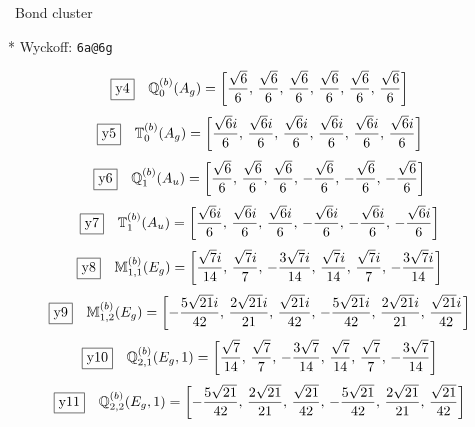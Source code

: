 \documentclass[fleqn,10pt,landscape]{jsarticle}
\begin{document}
\noindent\textbullet\, Bond cluster

\vspace{5mm}

\noindent ** Wyckoff: \texttt{6a@6g}

\begin{dmath*}
\fbox{y4}\quad \mathbb{Q}_{0}^{(b)}(A_{g})=\left[ \frac{\sqrt{6}}{6},\, \frac{\sqrt{6}}{6},\, \frac{\sqrt{6}}{6},\, \frac{\sqrt{6}}{6},\, \frac{\sqrt{6}}{6},\, \frac{\sqrt{6}}{6} \right]
\end{dmath*}
\begin{dmath*}
\fbox{y5}\quad \mathbb{T}_{0}^{(b)}(A_{g})=\left[ \frac{\sqrt{6} i}{6},\, \frac{\sqrt{6} i}{6},\, \frac{\sqrt{6} i}{6},\, \frac{\sqrt{6} i}{6},\, \frac{\sqrt{6} i}{6},\, \frac{\sqrt{6} i}{6} \right]
\end{dmath*}
\begin{dmath*}
\fbox{y6}\quad \mathbb{Q}_{1}^{(b)}(A_{u})=\left[ \frac{\sqrt{6}}{6},\, \frac{\sqrt{6}}{6},\, \frac{\sqrt{6}}{6},\, - \frac{\sqrt{6}}{6},\, - \frac{\sqrt{6}}{6},\, - \frac{\sqrt{6}}{6} \right]
\end{dmath*}
\begin{dmath*}
\fbox{y7}\quad \mathbb{T}_{1}^{(b)}(A_{u})=\left[ \frac{\sqrt{6} i}{6},\, \frac{\sqrt{6} i}{6},\, \frac{\sqrt{6} i}{6},\, - \frac{\sqrt{6} i}{6},\, - \frac{\sqrt{6} i}{6},\, - \frac{\sqrt{6} i}{6} \right]
\end{dmath*}
\begin{dmath*}
\fbox{y8}\quad \mathbb{M}_{1,1}^{(b)}(E_{g})=\left[ \frac{\sqrt{7} i}{14},\, \frac{\sqrt{7} i}{7},\, - \frac{3 \sqrt{7} i}{14},\, \frac{\sqrt{7} i}{14},\, \frac{\sqrt{7} i}{7},\, - \frac{3 \sqrt{7} i}{14} \right]
\end{dmath*}
\begin{dmath*}
\fbox{y9}\quad \mathbb{M}_{1,2}^{(b)}(E_{g})=\left[ - \frac{5 \sqrt{21} i}{42},\, \frac{2 \sqrt{21} i}{21},\, \frac{\sqrt{21} i}{42},\, - \frac{5 \sqrt{21} i}{42},\, \frac{2 \sqrt{21} i}{21},\, \frac{\sqrt{21} i}{42} \right]
\end{dmath*}
\begin{dmath*}
\fbox{y10}\quad \mathbb{Q}_{2,1}^{(b)}(E_{g},1)=\left[ \frac{\sqrt{7}}{14},\, \frac{\sqrt{7}}{7},\, - \frac{3 \sqrt{7}}{14},\, \frac{\sqrt{7}}{14},\, \frac{\sqrt{7}}{7},\, - \frac{3 \sqrt{7}}{14} \right]
\end{dmath*}
\begin{dmath*}
\fbox{y11}\quad \mathbb{Q}_{2,2}^{(b)}(E_{g},1)=\left[ - \frac{5 \sqrt{21}}{42},\, \frac{2 \sqrt{21}}{21},\, \frac{\sqrt{21}}{42},\, - \frac{5 \sqrt{21}}{42},\, \frac{2 \sqrt{21}}{21},\, \frac{\sqrt{21}}{42} \right]
\end{dmath*}
\end{document}
